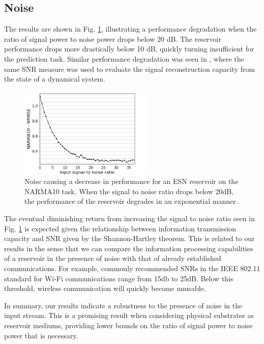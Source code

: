 \subsection{Noise}


The results are shown in Fig. \ref{input_noise_snr}, illustrating a performance
degradation when the ratio of signal power to noise power drops below 20 dB. The
reservoir performance drops more drastically below 10 dB, quickly turning
insufficient for the prediction task. Similar performance degradation was seen
in \cite{dambre_information_2012}, where the same SNR measure was used to
evaluate the signal reconstruction capacity from the state of a dynamical
system.

\begin{figure}
  \centering
  \includegraphics[width=2.5in]{img/input_noise_snr.png}
  \caption{
    Noise causing a decrease in performance for an ESN reservoir on the NARMA10
task. When the signal to noise ratio drops below 20dB, the performance of the
reservoir degrades in an exponential manner.
  }
  \label{input_noise_snr}
\end{figure}

The eventual diminishing return from increasing the signal to noise ratio seen
in Fig. \ref{input_noise_snr} is expected given the relationship between
information transmission capacity and SNR given by the Shannon-Hartley
theorem. This is related to our results in the sense that we can compare the
information processing capabilities of a reservoir in the presence of noise with
that of already established communications. For example, commonly recommended
SNRs in the IEEE 802.11 standard for Wi-Fi communications range from 15db to
25dB. Below this threshold, wireless communication will quickly become unusable.

In summary, our results indicate a robustness to the presence of noise in the
input stream. This is a promising result when considering physical substrates as
reservoir mediums, providing lower bounds on the ratio of signal power to noise
power that is necessary.


